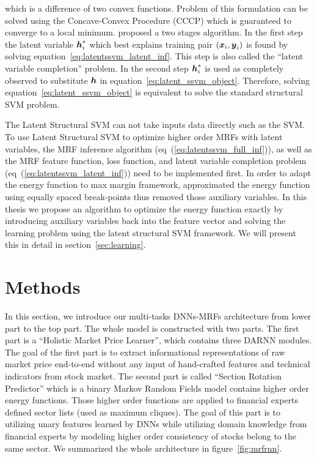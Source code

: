 \documentclass[sigconf, anonymous, review]{acmart}
\renewcommand{\citename}{\citet}
\renewcommand{\cite}{\citep}
\begin{document}
\noindent which is a difference of two convex functions. Problem
of this formulation can be solved using the Concave-Convex
Procedure (CCCP)\cite{yuille2002concave} which is guaranteed to
converge to a local minimum. \citename{yu2009learning} proposed a
two stages algorithm. In the first step the latent variable
${\boldsymbol{h}}_i^*$ which best explains training pair $({\boldsymbol{x}}_i, {\boldsymbol{y}}_i)$ is
found by solving equation~\eqref{eq:latentssvm_latent_inf}. This
step is also called the ``latent variable completion'' problem.
In the second step ${\boldsymbol{h}}_i^*$ is used as completely observed to
substitute ${\boldsymbol{h}}$ in equation~\eqref{eq:latent_ssvm_object}.
Therefore, solving equation~\eqref{eq:latent_ssvm_object} is
equivalent to solve the standard structural SVM problem.

The Latent Structural SVM can not take inputs data directly such
as the SVM. To use Latent Structural SVM to optimize higher order
MRFs with latent variables, the MRF inference algorithm
(eq~(\ref{eq:latentssvm_full_inf})), as well as the MRF feature
function, loss function, and latent variable completion problem
(eq~(\ref{eq:latentssvm_latent_inf})) need to be implemented
first. In order to adapt the energy function to max margin
framework, \citename{Gould:ICML2011} approximated the energy
function using equally spaced break-points thus removed those
auxiliary variables. In this thesis we propose an algorithm to
optimize the energy function exactly by introducing auxiliary
variables back into the feature vector and solving the learning
problem using the latent structural SVM framework. We will
present this in detail in section~\ref{sec:learning}.

\section{Methods}
\label{sec:meth}

In this section, we introduce our multi-tasks DNNs-MRFs
architecture from lower part to the top part. The whole model is
constructed with two parts. The first part is a ``Holistic Market
Price Learner'', which contains three DARNN modules. The goal of
the first part is to extract informational representations of raw
market price end-to-end without any input of hand-crafted
features and technical indicators from stock market. The second
part is called ``Section Rotation Predictor'' which is a binary
Markov Random Fields model contains higher order energy
functions. Those higher order functions are applied to financial
experts defined sector lists (used as maximum cliques). The goal
of this part is to utilizing unary features learned by DNNs while
utilizing domain knowledge from financial experts by modeling
higher order consistency of stocks belong to the same sector. We
summarized the whole architecture in figure~\ref{fig:mrfrnn}.
\end{document}
